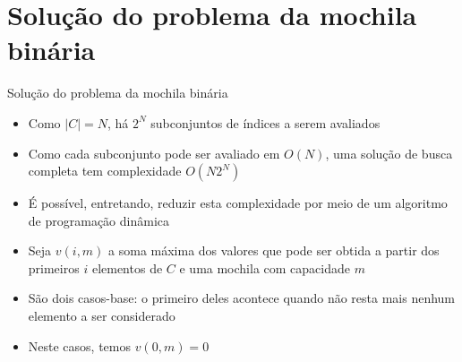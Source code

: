 \section{Solução do problema da mochila binária}

\begin{frame}[fragile]{Solução do problema da mochila binária}

    \begin{itemize}
        \item Como $|C| = N$, há $2^N$ subconjuntos de índices a serem avaliados

        \item Como cada subconjunto pode ser avaliado em $O(N)$, uma solução de busca
            completa tem complexidade $O(N2^N)$

        \item É possível, entretando, reduzir esta complexidade por meio de um algoritmo
            de programação dinâmica

        \item Seja $v(i, m)$ a soma máxima dos valores que pode ser obtida a partir dos
            primeiros $i$ elementos de $C$ e uma mochila com capacidade $m$

        \item São dois casos-base: o primeiro deles acontece quando não resta mais nenhum
            elemento a ser considerado

        \item Neste casos, temos $v(0, m) = 0$
    \end{itemize}

\end{frame}

